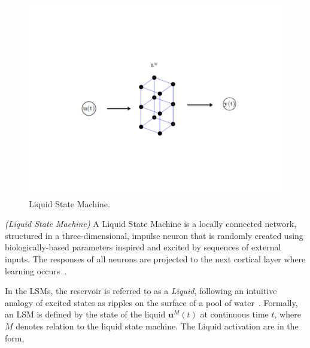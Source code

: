 \documentclass{WitsPhysicsReport}
\begin{document}
\begin{figure}[H]
\centering
  \includegraphics[width=\linewidth]{./Figure/LSM.pdf}
\caption{Liquid State Machine. }
\label{fig: Liquid_state_machine}
\end{figure}



\begin{definition}
\emph{(Liquid State Machine)}
A Liquid State Machine is a locally connected network, structured in a
three-dimensional, impulse neuron that is randomly created using biologically-based parameters inspired and excited by sequences of external inputs. The responses of all neurons are projected to the next cortical layer where learning occurs~\cite{maass2002real}.
\label{def:Liquid_State_Machine}
\end{definition}






In the LSMs, the reservoir is referred to as a \textit{Liquid}, following an intuitive analogy of excited states as ripples on the surface of a pool of water~\cite{lukovsevivcius2009reservoir}. Formally, an LSM is defined by the state of the liquid ${\mathbf{u}^{M}}(t)$  at continuous time $t$, where $M$ denotes relation to the liquid state machine. The Liquid activation are in the form,
\end{document}
